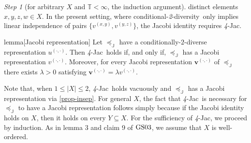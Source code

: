 \documentclass[ecta,nameyear,draft]{econsocart}
\newcommand{\mbbt}{{\mathds {T}}}
\newcommand{\mbbj}{\mathds J}
\newcommand{\xy}{{(x, y)}}
\newcommand{\yz}{{(y,z)}}
\newcommand{\dd}{{(\cdot,\cdot)}}
\newcommand{\condtwodiv}{\textup{conditional-\textit{2}-diversity}}
\newcommand{\fourjac}{\textup{\textit{4}-Jac}}
\newcommand{\gsii}{$\textup{GS03}$}
\theoremstyle{plain}
\theoremstyle{remark}
\newtheorem{step}{Step}[section]
\begin{document}
\begin{appendix}
\begin{step}[for arbitrary $X$ and $\mbbt < \infty$, the induction
    argument]
    distinct elements $x,y,z,w \in X$. In the present setting, where \condtwodiv\
    only implies linear independence of pairs $\{v^{\xy},v^{\yz}\}$, the Jacobi
    identity requires \fourjac.
  \begin{theoremEnd}{lemma}[Jacobi representation]\label{lem-induction} Let
    $\preceq_{\mbbj}$ have a conditionally-$2$-diverse representation $u^{\dd}$.
    Then \fourjac\ holds if, and only if, $\preceq_{\mbbj}$ has a Jacobi
    representation $v^{\dd}$.  Moreover, for every Jacobi representation $\mathbf
    v^{\dd}$ of $\preceq_{\mbbj}$ there exists $\lambda > 0$ satisfying
    $\mathbf v^{(\cdot, \cdot)} = \lambda v^{(\cdot, \cdot)}$.
  \end{theoremEnd}
  \begin{proofEnd}\label{proof-lem-induction}%
    Note that, when $1 \leq \lvert X \rvert \leq 2$, \fourjac\ holds vacuously
    and $\preceq_{\mbbj}$ has a Jacobi representation via \cref{prop-insep}.  For
    general $X$, the fact that \fourjac\ is necessary for $\preceq_{\mbbj}$ to
    have a Jacobi representation follows simply because if the Jacobi identity
    holds on $X$, then it holds on every $Y\subseteq X$. For the sufficiency of
    \fourjac, we proceed by induction.  As in lemma 3 and claim 9 of \gsii, we
    assume that $X$ is well-ordered.  
  
  

\end{proofEnd}
\end{step}
\end{appendix}
\end{document}
